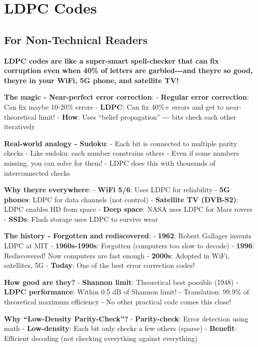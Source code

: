 \section{LDPC Codes}\label{ldpc-codes}

\subsection{\texorpdfstring{ For Non-Technical
Readers}{ For Non-Technical Readers}}\label{for-non-technical-readers}

\textbf{LDPC codes are like a super-smart spell-checker that can fix
corruption even when 40\% of letters are garbled-\/-\/-and
they\textquotesingle re so good, they\textquotesingle re in your WiFi,
5G phone, and satellite TV!}

\textbf{The magic - Near-perfect error correction}: - \textbf{Regular
error correction}: Can fix maybe 10-20\% errors - \textbf{LDPC}: Can fix
40\%+ errors and get to near-theoretical limit! - \textbf{How}: Uses
``belief propagation'' -\/-\/- bits check each other iteratively

\textbf{Real-world analogy - Sudoku}: - Each bit is connected to
multiple parity checks - Like sudoku: each number constrains others -
Even if some numbers missing, you can solve for them! - LDPC does this
with thousands of interconnected checks

\textbf{Why they\textquotesingle re everywhere}: - \textbf{WiFi 5/6}:
Uses LDPC for reliability - \textbf{5G phones}: LDPC for data channels
(not control) - \textbf{Satellite TV (DVB-S2)}: LDPC enables HD from
space - \textbf{Deep space}: NASA uses LDPC for Mars rovers -
\textbf{SSDs}: Flash storage uses LDPC to survive wear

\textbf{The history - Forgotten and rediscovered}: - \textbf{1962}:
Robert Gallager invents LDPC at MIT - \textbf{1960s-1990s}: Forgotten
(computers too slow to decode) - \textbf{1996}: Rediscovered! Now
computers are fast enough - \textbf{2000s}: Adopted in WiFi, satellites,
5G - \textbf{Today}: One of the best error correction codes!

\textbf{How good are they?} - \textbf{Shannon limit}: Theoretical best
possible (1948) - \textbf{LDPC performance}: Within 0.5 dB of Shannon
limit! - Translation: 99.9\% of theoretical maximum efficiency - No
other practical code comes this close!

\textbf{Why ``Low-Density Parity-Check''?} - \textbf{Parity-check}:
Error detection using math - \textbf{Low-density}: Each bit only checks
a few others (sparse) - \textbf{Benefit}: Efficient decoding (not
checking everything against everything)

